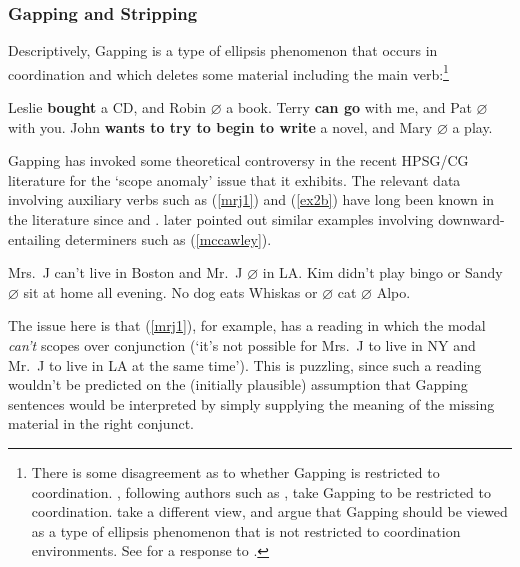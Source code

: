 \documentclass[output=paper]{langsci/langscibook}
\begin{document}
\subsubsection{Gapping and Stripping \label{sec:gapping}}

Descriptively, Gapping is a type of ellipsis phenomenon that occurs
in coordination and which deletes some material including the main
verb:\footnote{There is some disagreement as to whether Gapping is
restricted to coordination. \citet{kubota-levine-gapping}, following authors
such as \citet{johnson2009}, take Gapping to be restricted to coordination.
\citet{parkea18gapping} take a different view, and argue that Gapping
should be viewed as a type of ellipsis phenomenon that is not
restricted to coordination environments. See \citet{KubotaLevineBook}
for a  response to \citet{parkea18gapping}.}

\begin{exe}
 \ex\label{gapping}
  \begin{xlist}
 \ex
    Leslie \textbf{bought} a CD, and Robin   \ensuremath{\varnothing}  a book.
 \ex
    Terry \textbf{can go} with me, and Pat  \ensuremath{\varnothing}  with you.
 \ex
    John \textbf{wants to try to begin to write} a novel, and Mary  \ensuremath{\varnothing}  a play.
  \end{xlist}
\end{exe}
Gapping has invoked some theoretical controversy in the recent
HPSG/CG literature for the `scope anomaly' issue that it exhibits.
The relevant data involving auxiliary verbs such as (\ref{mrj1}) and (\ref{ex2b})
have long been known in the literature since
\citet{oehrle71,oehrle1987} and 
\citet{siegel87}. \citet{mccawley1993} later pointed out similar examples
involving downward-entailing determiners such as (\ref{mccawley}).

\begin{exe}
 \ex\label{scope}
  \begin{xlist}
 \ex\label{mrj1}
    Mrs.\ J can't live in Boston and Mr.\ J  \ensuremath{\varnothing}  in LA.
 \ex\label{ex2b}
    Kim didn't play bingo or Sandy  \ensuremath{\varnothing}  sit at home all evening.
 \ex\label{mccawley}
    No dog eats Whiskas or  \ensuremath{\varnothing}  cat  \ensuremath{\varnothing}  Alpo.
  \end{xlist}
\end{exe}
The issue here is that (\ref{mrj1}), for example, has a reading in
which the modal \textit{can't} scopes over conjunction (`it's not
possible for Mrs.~J to live in NY and Mr.~J to live in LA at the same
time'). This is puzzling, since such a reading wouldn't be predicted
on the (initially plausible) assumption that Gapping sentences would
be interpreted by simply supplying the meaning of the missing material
in the right conjunct.
\end{document}
